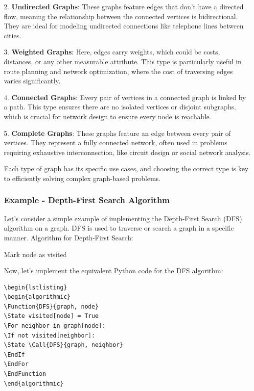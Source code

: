 \documentclass[12pt]{book} %
\begin{document}
2. \textbf{Undirected Graphs}: These graphs feature edges that don’t have a directed flow, meaning the relationship between the connected vertices is bidirectional. They are ideal for modeling undirected connections like telephone lines between cities.

3. \textbf{Weighted Graphs}: Here, edges carry weights, which could be costs, distances, or any other measurable attribute. This type is particularly useful in route planning and network optimization, where the cost of traversing edges varies significantly.

4. \textbf{Connected Graphs}: Every pair of vertices in a connected graph is linked by a path. This type ensures there are no isolated vertices or disjoint subgraphs, which is crucial for network design to ensure every node is reachable.

5. \textbf{Complete Graphs}: These graphs feature an edge between every pair of vertices. They represent a fully connected network, often used in problems requiring exhaustive interconnection, like circuit design or social network analysis.

Each type of graph has its specific use cases, and choosing the correct type is key to efficiently solving complex graph-based problems.


\subsubsection{Example - Depth-First Search Algorithm}

Let's consider a simple example of implementing the Depth-First Search (DFS) algorithm on a graph. DFS is used to traverse or search a graph in a specific manner.
\FloatBarrier
Algorithm for Depth-First Search:
\FloatBarrier
\begin{algorithm}
\caption{Depth-First Search}
\begin{algorithmic}[1]
\State Mark node as visited
\State {}
\EndIf
\EndFor
\EndFunction
\end{algorithmic}
\end{algorithm}
\FloatBarrier
Now, let's implement the equivalent Python code for the DFS algorithm:
\FloatBarrier
\begin{lstlisting}
\begin{lstlisting}
\begin{algorithmic}
\Function{DFS}{graph, node}
\State visited[node] = True
\For neighbor in graph[node]:
\If not visited[neighbor]:
\State \Call{DFS}{graph, neighbor}
\EndIf
\EndFor
\EndFunction
\end{algorithmic}
\end{lstlisting}
\FloatBarrier
\end{document}
